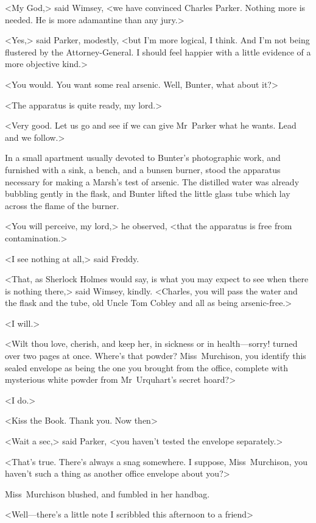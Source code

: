 <My God,> said Wimsey, <we have convinced Charles Parker. Nothing more is needed. He is more adamantine than any jury.>

<Yes,> said Parker, modestly, <but I'm more logical, I think. And I'm not being flustered by the Attorney-General. I should feel happier with a little evidence of a more objective kind.>

<You would. You want some real arsenic. Well, Bunter, what about it?>

<The apparatus is quite ready, my lord.>

<Very good. Let us go and see if we can give Mr~Parker what he wants. Lead and we follow.>

In a small apartment usually devoted to Bunter's photographic work, and furnished with a sink, a bench, and a bunsen burner, stood the apparatus necessary for making a Marsh's test of arsenic. The distilled water was already bubbling gently in the flask, and Bunter lifted the little glass tube which lay across the flame of the burner.

<You will perceive, my lord,> he observed, <that the apparatus is free from contamination.>

<I see nothing at all,> said Freddy.

<That, as Sherlock Holmes would say, is what you may expect to see when there is nothing there,> said Wimsey, kindly. <Charles, you will pass the water and the flask and the tube, old Uncle Tom Cobley and all as being arsenic-free.>

<I will.>

<Wilt thou love, cherish, and keep her, in sickness or in health—sorry! turned over two pages at once. Where's that powder? Miss~Murchison, you identify this sealed envelope as being the one you brought from the office, complete with mysterious white powder from Mr~Urquhart's secret hoard?>

<I do.>

<Kiss the Book. Thank you. Now then\longdash>

<Wait a sec,> said Parker, <you haven't tested the envelope separately.>

<That's true. There's always a snag somewhere. I suppose, Miss~Murchison, you haven't such a thing as another office envelope about you?>

Miss~Murchison blushed, and fumbled in her handbag.

<Well—there's a little note I scribbled this afternoon to a friend\longdash>

